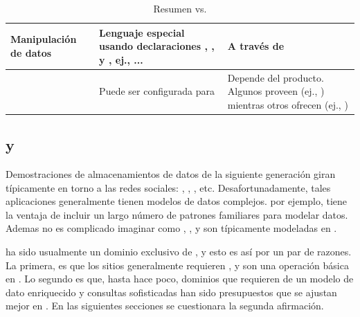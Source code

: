 \begin{table}[h!]
\begin{tabular}{ |L{0.1\paperwidth}|L{0.3\paperwidth}|L{0.3\paperwidth}|}
\\ \hline
	Manipulación de datos&
	
	Lenguaje especial usando declaraciones \selectDB, \insertDB, y \updateDB, ej., \selectDBUpper \fields \fromDBUpper \tableDB \whereDBUpper ... &	
	
	A través de \apisAS \objectOrientedPL

\\ \hline

	\consistencyDB&
	
	Puede ser configurada para \strongConsistency&
	
	Depende del producto. Algunos proveen \strongConsistency (ej., \mongodbNAME) mientras otros ofrecen \eventualConsistency (ej., \cassandraNAME)

\\ \hline
\end{tabular}
    \caption{ Resumen \nosqlNAME vs. \sqlNAME}
    \label{tab:SQL_vs_noSQL_summary}
\end{table}

\subsection{\mongodbNAME y \ecommerce \cite{online_mongodb_ecommerce}}
\label{cap:justificacion_proyecto:MongoDB_ECommerce}

Demostraciones de almacenamientos de datos de la siguiente generación giran típicamente en torno a las redes sociales: \twitterNAME, \facebook, \foursquare, etc. Desafortunadamente, tales aplicaciones generalmente tienen modelos de datos complejos. \ecommerce por ejemplo, tiene la ventaja de incluir un largo número de patrones familiares para modelar datos. Ademas no es complicado imaginar como \itemCOM, \categoriesCommerce, \itemReviewsCommerce y \ordersCommerce son típicamente modeladas en \rdbms.

\ecommerce ha sido usualmente un dominio exclusivo de \rdbms, y esto es así por un par de razones. La primera, es que los sitios \ecommerce generalmente requieren \transactionsDB, y \transactionsDB son una operación básica en \rdbms. Lo segundo es que, hasta hace poco, dominios que requieren de un modelo de dato enriquecido y consultas sofisticadas han sido presupuestos que se ajustan mejor en \rdbms. En las siguientes secciones se cuestionara la segunda afirmación. 

